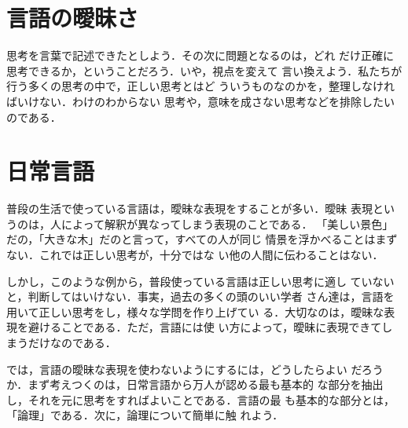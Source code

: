        \section{言語の曖昧さ}
            思考を言葉で記述できたとしよう．その次に問題となるのは，どれ
            だけ正確に思考できるか，ということだろう．いや，視点を変えて
            言い換えよう．私たちが行う多くの思考の中で，正しい思考とはど
            ういうものなのかを，整理しなければいけない．わけのわからない
            思考や，意味を成さない思考などを排除したいのである．


        \section{日常言語}
            普段の生活で使っている言語は，曖昧な表現をすることが多い．曖昧
            表現というのは，人によって解釈が異なってしまう表現のことである．
            「美しい景色」だの，「大きな木」だのと言って，すべての人が同じ
            情景を浮かべることはまずない．これでは正しい思考が，十分ではな
            い他の人間に伝わることはない．

            しかし，このような例から，普段使っている言語は正しい思考に適し
            ていないと，判断してはいけない．事実，過去の多くの頭のいい学者
            さん達は，言語を用いて正しい思考をし，様々な学問を作り上げてい
            る．大切なのは，曖昧な表現を避けることである．ただ，言語には使
            い方によって，曖昧に表現できてしまうだけなのである．

            では，言語の曖昧な表現を使わないようにするには，どうしたらよい
            だろうか．まず考えつくのは，日常言語から万人が認める最も基本的
            な部分を抽出し，それを元に思考をすればよいことである．言語の最
            も基本的な部分とは，「論理」である．次に，論理について簡単に触
            れよう．

